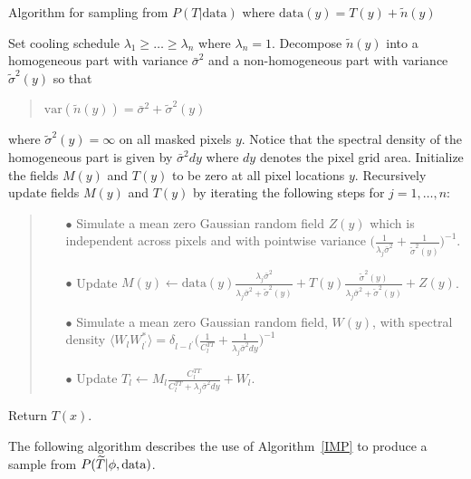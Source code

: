 \documentclass[iop,revtex4,apj,onecolumn]{emulateapj}
\begin{document}
\begin{algorithm}[H]
\small
\caption{Algorithm for sampling from $P(T | \text{data})$ where $\text{data}(y) =  T(y) + \tilde n(y)$}
\label{IMP}
\begin{algorithmic}[1]
\State Set cooling schedule $\lambda_1\geq  \ldots \geq \lambda_n$ where $\lambda_n = 1$. 
\State Decompose $\tilde n(y)$ into a homogeneous part with variance
$\bar\sigma^2$ and a non-homogeneous part with variance $\tilde\sigma^{2}(y)$ so that 
\begin{quote}
$\text{var}(\tilde n(y)) = \bar\sigma^2 + \tilde\sigma^{2}(y)$ 
\end{quote}
where $\tilde \sigma^2(y) = \infty$ on all masked pixels $y$. Notice that the spectral density of the homogeneous part is given by $ \bar\sigma^2 dy$ where  $dy$ denotes the pixel grid area. 
\State Initialize the fields $M(y)$ and $T(y)$  to be zero at all pixel locations $y$.
\State Recursively update fields $M(y)$ and $T(y)$ by iterating the following steps for $j = 1, \ldots, n$:
\begin{quote}
\begin{itemize}
\item[$\bullet$] Simulate a mean zero Gaussian random field $Z(y)$ which is independent across pixels and with pointwise variance $\bigl(\frac{1}{\lambda_j\bar\sigma^{2}} + \frac{1}{\tilde\sigma^{2}(y)}\bigr)^{-1}$.
\item[$\bullet$] Update 
$M(y) \leftarrow \text{data}(y)\displaystyle\frac{\lambda_j\bar\sigma^{2}}{\lambda_j \bar\sigma^2 + \tilde \sigma^2(y)} + T(y)\frac{\tilde\sigma^{2}(y)}{\lambda_j\bar\sigma^2 + \tilde \sigma^2(y)}  + Z(y) $.
\item[$\bullet$] Simulate a mean zero Gaussian random field, $W(y)$, with spectral density
$\langle W_l W_{l^\prime}^*\rangle = \delta_{l-l^\prime}\bigl( \frac{1}{C^{TT}_l} + \frac{1}{\lambda_j \bar\sigma^2 dy} \bigr)^{-1}$
\item[$\bullet$] Update  $T_l \leftarrow  M_l\displaystyle\frac{C^{TT}_l}{C^{TT}_l + \lambda_j   \bar\sigma^2 dy} + W_l$. 
\end{itemize}
\end{quote}
\State Return $T(x)$.
\end{algorithmic}
\end{algorithm}




The following algorithm describes the use of Algorithm~\ref{IMP} to produce a sample from $ P(\widetilde T |  \phi,\text{\rm data})$.
\end{document}
